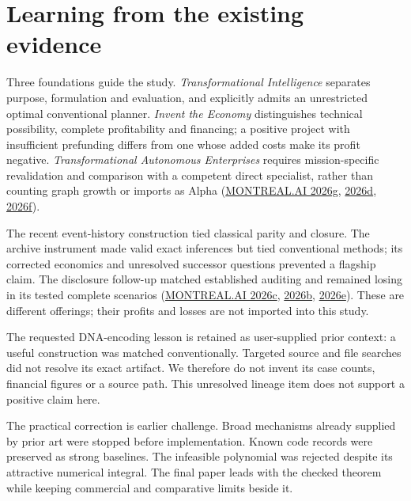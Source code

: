 \documentclass[11pt,a4paper]{article}
\begin{document}

\hypertarget{learning-from-the-existing-evidence}{%
\section{Learning from the existing
evidence}\label{learning-from-the-existing-evidence}}

Three foundations guide the study. \emph{Transformational Intelligence}
separates purpose, formulation and evaluation, and explicitly admits an
unrestricted optimal conventional planner. \emph{Invent the Economy}
distinguishes technical possibility, complete profitability and
financing; a positive project with insufficient prefunding differs from
one whose added costs make its profit negative. \emph{Transformational
Autonomous Enterprises} requires mission-specific revalidation and
comparison with a competent direct specialist, rather than counting
graph growth or imports as Alpha
(\protect\hyperlink{ref-transformational2026}{MONTREAL.AI 2026g},
\protect\hyperlink{ref-economy2026}{2026d},
\protect\hyperlink{ref-enterprises2026}{2026f}).

The recent event-history construction tied classical parity and closure.
The archive instrument made valid exact inferences but tied conventional
methods; its corrected economics and unresolved successor questions
prevented a flagship claim. The disclosure follow-up matched established
auditing and remained losing in its tested complete scenarios
(\protect\hyperlink{ref-event2026}{MONTREAL.AI 2026c},
\protect\hyperlink{ref-archive2026}{2026b},
\protect\hyperlink{ref-disclosure2026}{2026e}). These are different
offerings; their profits and losses are not imported into this study.

The requested DNA-encoding lesson is retained as user-supplied prior
context: a useful construction was matched conventionally. Targeted
source and file searches did not resolve its exact artifact. We
therefore do not invent its case counts, financial figures or a source
path. This unresolved lineage item does not support a positive claim
here.

The practical correction is earlier challenge. Broad mechanisms already
supplied by prior art were stopped before implementation. Known code
records were preserved as strong baselines. The infeasible polynomial
was rejected despite its attractive numerical integral. The final paper
leads with the checked theorem while keeping commercial and comparative
limits beside it.
\end{document}

